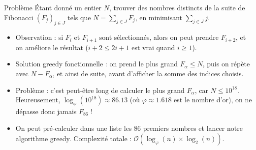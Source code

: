 \begin{frame}
    \frametitle{\problemtitle}
    \begin{block}{Problème}
        Étant donné un entier $N$, trouver des nombres distincts de la suite de Fibonacci $(F_{j})_{j \in J}$ tels que $N = \sum_{j \in J} F_{j}$, en minimisant $\sum_{j \in J} j$.
    \end{block}
    \pause
    \begin{itemize}[<+->]
        \item Observation : si $F_i$ et $F_{i+1}$ sont sélectionnés, alors on peut prendre $F_{i+2}$, et on améliore le résultat ($i+2 \leq 2i+1$ est vrai quand $i \geq 1$).
        \item Solution greedy fonctionnelle : on prend le plus grand $F_\alpha \leq N$, puis on répète avec $N - F_{\alpha}$, et ainsi de suite, avant d'afficher la somme des indices choisis.
        \item Problème : c'est peut-être long de calculer le plus grand $F_\alpha$, car $N \leq 10^{18}$. Heureusement, $\log_{\varphi}(10^{18}) \approx 86.13$ (où $\varphi \approx 1.618$ est le nombre d'or), on ne dépasse donc jamais $F_{86}$ !
        \item On peut pré-calculer dans une liste les $86$ premiers nombres et lancer notre algorithme greedy. Complexité totale : $\mathcal{O}(\log_{\varphi}(n) \times \log_{2}(n))$.
    \end{itemize}

\end{frame}
